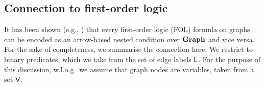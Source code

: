\subsection{Connection to first-order logic}
\label{sec:FOL}

It has been shown (e.g., \cite{Rensink-FOL,Habel-FOL}) that every first-order logic (FOL) formula on graphs can be encoded as an arrow-based nested condition over $\mathbf{Graph}$ and vice versa. For the sake of completeness, we summarise the connection here. We restrict to binary predicates, which we take from the set of edge labels $\mathsf{L}$. For the purpose of this discussion, w.l.o.g.\ we assume that graph nodes are variables, taken from a set $\mathsf{V}$.



